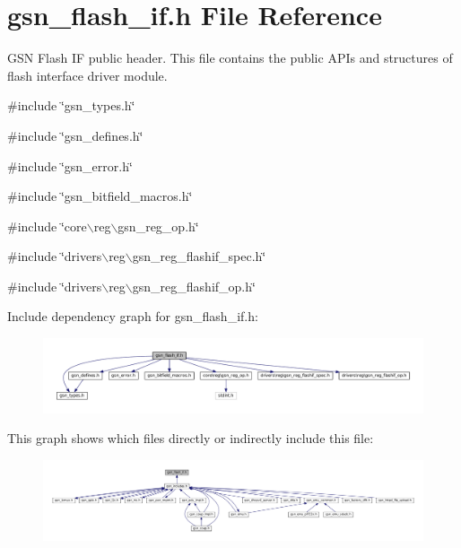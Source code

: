 \hypertarget{a00501}{
\section{gsn\_\-flash\_\-if.h File Reference}
\label{a00501}
}


GSN Flash IF public header. This file contains the public APIs and structures of flash interface driver module.  


{\ttfamily \#include \char`\"{}gsn\_\-types.h\char`\"{}}\par
{\ttfamily \#include \char`\"{}gsn\_\-defines.h\char`\"{}}\par
{\ttfamily \#include \char`\"{}gsn\_\-error.h\char`\"{}}\par
{\ttfamily \#include \char`\"{}gsn\_\-bitfield\_\-macros.h\char`\"{}}\par
{\ttfamily \#include \char`\"{}core$\backslash$reg$\backslash$gsn\_\-reg\_\-op.h\char`\"{}}\par
{\ttfamily \#include \char`\"{}drivers$\backslash$reg$\backslash$gsn\_\-reg\_\-flashif\_\-spec.h\char`\"{}}\par
{\ttfamily \#include \char`\"{}drivers$\backslash$reg$\backslash$gsn\_\-reg\_\-flashif\_\-op.h\char`\"{}}\par
Include dependency graph for gsn\_\-flash\_\-if.h:
\nopagebreak
\begin{figure}[H]
\begin{center}
\leavevmode
\includegraphics[width=400pt]{a00731}
\end{center}
\end{figure}
This graph shows which files directly or indirectly include this file:
\nopagebreak
\begin{figure}[H]
\begin{center}
\leavevmode
\includegraphics[width=400pt]{a00732}
\end{center}
\end{figure}
